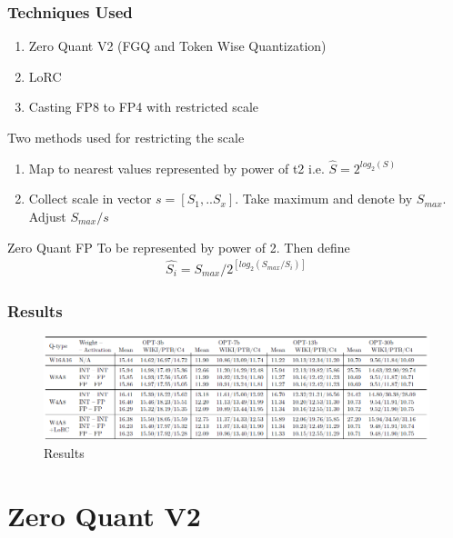 \documentclass{beamer}
\theoremstyle{plain}
\theoremstyle{definition}
\theoremstyle{remark}
\numberwithin{equation}{section}
\numberwithin{figure}{section}
\numberwithin{theorem}{section}
\begin{document}
\begin{frame}
\frametitle{Techniques Used}
\begin{enumerate}
    \item Zero Quant V2 (FGQ and Token Wise Quantization)
    \item LoRC
    \item Casting FP8 to FP4 with restricted scale
\end{enumerate}
Two methods used for restricting the scale
\begin{enumerate}
    \item Map to nearest values represented by power of t2 i.e. $\hat{S} = 2^{log_2(S)}$
    \item Collect scale in vector $s= [S_1,.. S_x]$. Take maximum and denote by $S_{max}$. Adjust  $S_{max}/s$
\end{enumerate}
\end{frame}




\begin{frame}{Zero Quant FP}
    To be represented by power of 2. Then define
    \begin{align}
    \hat{S_i} = S_{max}/2^{ [log_2(S_{max}/S_i)]}    
    \end{align}
\end{frame}

\begin{frame}
\frametitle{Results}
\begin{figure}
    \centering
    \includegraphics[width=0.9\linewidth]{results_int8_vs_fp4.png}
    \caption{Results}
    \label{fig:int4_vs_fp4_results}
\end{figure}
\end{frame}
\section{Zero Quant V2}
\end{document}
